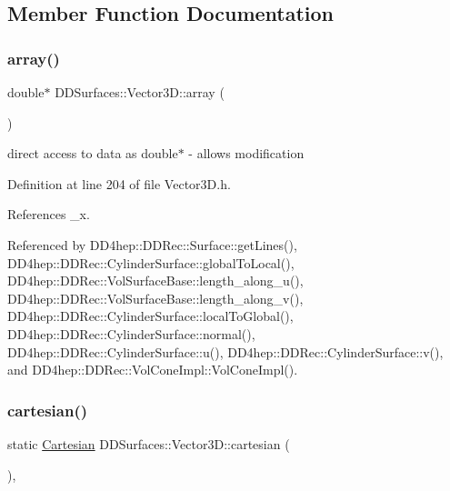 \subsection{Member Function Documentation}
\hypertarget{class_d_d_surfaces_1_1_vector3_d_a467bf79fd3e74223a070ecc612d54526}{}\label{class_d_d_surfaces_1_1_vector3_d_a467bf79fd3e74223a070ecc612d54526} 
\subsubsection{\texorpdfstring{array()}{array()}}
{\footnotesize\ttfamily double$\ast$ D\+D\+Surfaces\+::\+Vector3\+D\+::array (\begin{DoxyParamCaption}{ }\end{DoxyParamCaption})\hspace{0.3cm}{\ttfamily [inline]}}



direct access to data as double$\ast$ -\/ allows modification 



Definition at line 204 of file Vector3\+D.\+h.



References \+\_\+x.



Referenced by D\+D4hep\+::\+D\+D\+Rec\+::\+Surface\+::get\+Lines(), D\+D4hep\+::\+D\+D\+Rec\+::\+Cylinder\+Surface\+::global\+To\+Local(), D\+D4hep\+::\+D\+D\+Rec\+::\+Vol\+Surface\+Base\+::length\+\_\+along\+\_\+u(), D\+D4hep\+::\+D\+D\+Rec\+::\+Vol\+Surface\+Base\+::length\+\_\+along\+\_\+v(), D\+D4hep\+::\+D\+D\+Rec\+::\+Cylinder\+Surface\+::local\+To\+Global(), D\+D4hep\+::\+D\+D\+Rec\+::\+Cylinder\+Surface\+::normal(), D\+D4hep\+::\+D\+D\+Rec\+::\+Cylinder\+Surface\+::u(), D\+D4hep\+::\+D\+D\+Rec\+::\+Cylinder\+Surface\+::v(), and D\+D4hep\+::\+D\+D\+Rec\+::\+Vol\+Cone\+Impl\+::\+Vol\+Cone\+Impl().

\hypertarget{class_d_d_surfaces_1_1_vector3_d_a983814268a129992e3010f4964cd2b63}{}\label{class_d_d_surfaces_1_1_vector3_d_a983814268a129992e3010f4964cd2b63} 
\subsubsection{\texorpdfstring{cartesian()}{cartesian()}}
{\footnotesize\ttfamily static \hyperlink{struct_d_d_surfaces_1_1_vector3_d_1_1_cartesian}{Cartesian} D\+D\+Surfaces\+::\+Vector3\+D\+::cartesian (\begin{DoxyParamCaption}{ }\end{DoxyParamCaption})\hspace{0.3cm}{\ttfamily [inline]}, {\ttfamily [static]}}



